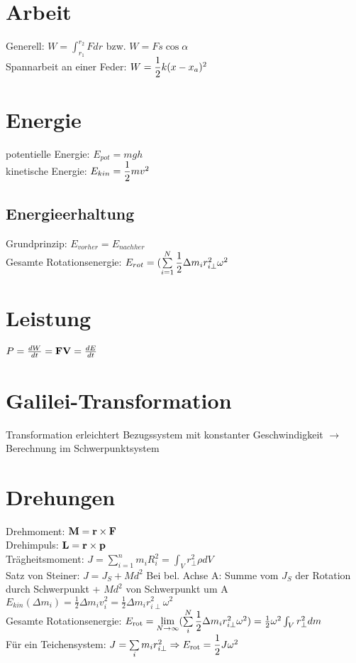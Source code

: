 \documentclass[fs, footer]{latex4ei}
\begin{document}
\begin{multicols*}{4}

\section{Arbeit}
Generell: $W = \int_{r_1}^{r_2} F dr$ bzw. $W = Fs\cos \alpha$\\
Spannarbeit an einer Feder: $W = \dfrac{1}{2} k(x-x_a)^2 $\\

\section{Energie}
potentielle Energie: $E_{pot} = mgh$\\
kinetische Energie: $E_{kin} = \dfrac{1}{2}mv^2$\\
\subsection{Energieerhaltung}
Grundprinzip: $E_{vorher} = E_{nachher}$\\
Gesamte Rotationsenergie: $E_{rot} = (\sum_{i=1}^N \fr{1}{2} \Delta m_ir_{i\perp}^2\omega ^2$\\

\section{Leistung}
$P = \frac{dW}{dt} = \textbf{F}\textbf{V} = \frac{dE}{dt}$\\




\section{Galilei-Transformation}
Transformation erleichtert Bezugssystem mit konstanter Geschwindigkeit
$\rightarrow$ Berechnung im Schwerpunktsystem

\section{Drehungen}
Drehmoment: $\textbf{M} = \textbf{r} \times \textbf{F}$\\
Drehimpuls: $\textbf{L} = \textbf{r} \times \textbf{p}$\\
Trägheitsmoment: $J = \sum_{i=1}^n m_iR_i^2 = \int_V r_\perp^2\rho dV$\\
Satz von Steiner: $J = J_S + Md^2$ Bei bel. Achse A: Summe vom $J_S$ der Rotation durch Schwerpunkt + $Md^2$ von Schwerpunkt um A\\ %
$E_{kin}(\Delta m_i)=\frac{1}{2}\Delta m_iv_i^2=\frac{1}{2}\Delta m_ir_{i\perp}^2 \omega^2$\\
Gesamte Rotationsenergie: $E_{\text{rot}}=\lim_{N \rightarrow \infty} (\sum_i^N  \fr{1}{2}\Delta m_ir_{i\perp}^2 \omega^2)=\frac{1}{2} \omega ^2\int_Vr_\perp^2 dm$\\
Für ein Teichensystem: $J = \sum_{i}m_ir_{i\perp}^2 \Rightarrow E_{\text{rot}}=\fr{1}{2}J\omega^2$\\

\end{multicols*}
\end{document}
